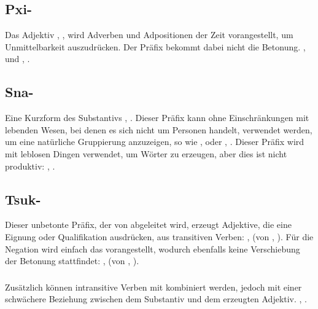 \subsection{Pxi-} Das Adjektiv , , wird Adverben und Adpositionen der
Zeit vorangestellt, um Unmittelbarkeit auszudr\"ucken. Der Pr\"afix bekommt dabei nicht
die Betonung.
,  und , .

\subsection{Sna-} Eine Kurzform des Substantivs , .
Dieser Pr\"afix kann ohne Einschr\"ankungen mit lebenden Wesen, bei denen es sich nicht um
Personen handelt, verwendet werden, um eine nat\"urliche Gruppierung anzuzeigen, so wie
,  oder , .
Dieser Pr\"afix wird mit leblosen Dingen verwendet, um W\"orter zu erzeugen, aber dies ist
nicht produktiv: , .

\subsection{Tsuk-} Dieser unbetonte Pr\"afix, der von  abgeleitet wird, erzeugt
Adjektive, die eine Eignung oder Qualifikation ausdr\"ucken, aus transitiven Verben:
,  (von , ).
F\"ur die Negation wird einfach das  vorangestellt, wodurch ebenfalls keine
Verschiebung der Betonung stattfindet: ,
 (von , ).

\subsubsection{} Zus\"atzlich k\"onnen intransitive Verben mit
 kombiniert werden, jedoch mit einer schw\"achere Beziehung zwischen dem
Substantiv und dem erzeugten Adjektiv.
, 
 .

